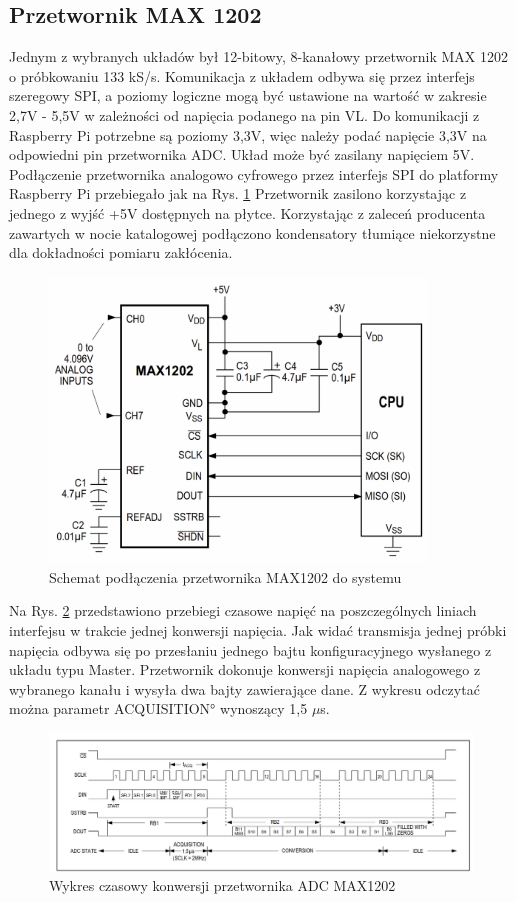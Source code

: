 \subsection{Przetwornik MAX 1202}

Jednym z wybranych układów był 12-bitowy, 8-kanałowy przetwornik MAX 1202 o próbkowaniu 133 kS/s. Komunikacja z układem odbywa się przez interfejs szeregowy SPI, a poziomy logiczne mogą być ustawione na wartość w zakresie 2,7V - 5,5V w zależności od napięcia podanego na pin VL. Do komunikacji z Raspberry Pi potrzebne są poziomy 3,3V, więc należy podać napięcie 3,3V na odpowiedni pin przetwornika ADC. Układ może być zasilany napięciem 5V.
Podłączenie przetwornika analogowo cyfrowego przez interfejs SPI do platformy Raspberry Pi przebiegało jak na Rys. \ref{fig:maxandrpi} Przetwornik zasilono korzystając z jednego z wyjść +5V dostępnych na płytce. Korzystając z zaleceń producenta zawartych w nocie katalogowej \cite{maxdatasheet} podłączono kondensatory tłumiące niekorzystne dla dokładności pomiaru zakłócenia.  


\begin{figure}[h]
	\centering
		\includegraphics[width=10cm]{max1202_sch}
	\caption{Schemat podłączenia przetwornika MAX1202 do systemu} 
	\label{fig:maxandrpi}
\end{figure}
\newpage
Na Rys. \ref{fig:maxczasowy} przedstawiono przebiegi czasowe napięć na poszczególnych liniach interfejsu w trakcie jednej konwersji napięcia. Jak widać transmisja jednej próbki napięcia odbywa się po przesłaniu jednego bajtu konfiguracyjnego wysłanego z układu typu Master. Przetwornik dokonuje konwersji napięcia analogowego z wybranego kanału i wysyła dwa bajty zawierające dane. Z wykresu odczytać można parametr \ang{ACQUISITION} wynoszący 1,5 $\mu$s. 


\begin{figure}[h]
	\centering
		\includegraphics[width=14cm]{max1202time}
	\caption{Wykres czasowy konwersji przetwornika ADC MAX1202} 
	\label{fig:maxczasowy}
\end{figure}


